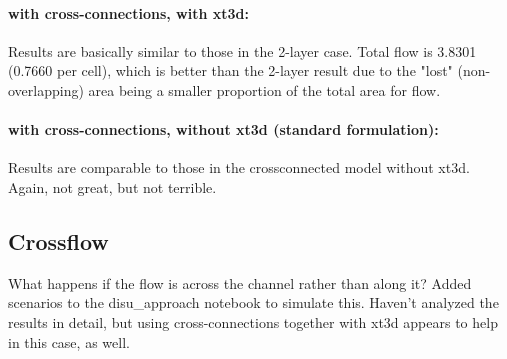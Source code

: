 \documentclass{article}
\begin{document}
\paragraph{with cross-connections, with xt3d:} Results are basically similar to those in the 2-layer case. Total flow is 3.8301 (0.7660 per cell), which is better than the 2-layer result due to the "lost" (non-overlapping) area being a smaller proportion of the total area for flow.

\paragraph{with cross-connections, without xt3d (standard formulation):} Results are comparable to those in the crossconnected model without xt3d. Again, not great, but not terrible.

\subsection{Crossflow}
What happens if the flow is across the channel rather than along it? Added scenarios to the disu\_approach notebook to simulate this. Haven't analyzed the results in detail, but using cross-connections together with xt3d appears to help in this case, as well. 
\end{document}
